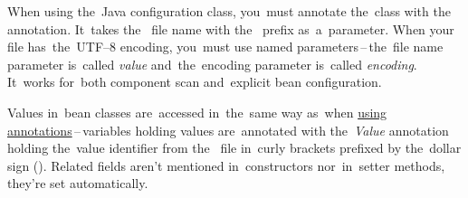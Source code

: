 When using the~Java configuration class, you~must annotate the~class with the~ annotation.
It~takes the~ file name with the~ prefix as~a~parameter.
When your  file has~the~UTF--8 encoding, you~must use named parameters\,--\,the~file name parameter is~called \textit{value} and~the~encoding parameter is~called \textit{encoding}.
It~works for~both component scan and~explicit bean configuration.

Values in~bean classes are~accessed in~the~same way as~when \hyperref[readingpropertiesannotations]{using annotations}\,--\,variables holding values are~annotated with the~\textit{Value} annotation holding the~value identifier from the~ file in~curly brackets prefixed by the~dollar sign ().
Related fields aren't mentioned in~constructors nor~in~setter methods, they're set automatically.

